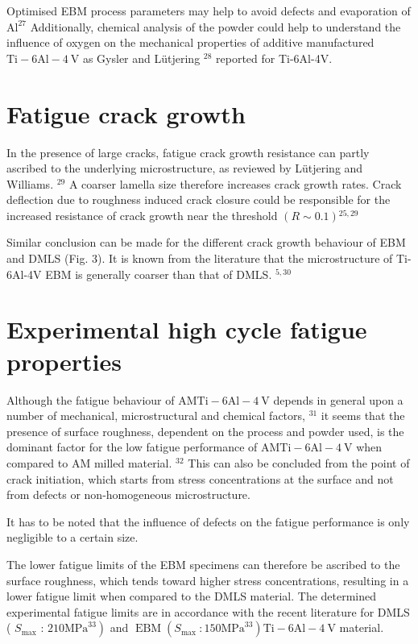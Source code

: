 \documentclass[10pt]{article}
\begin{document}
Optimised EBM process parameters may help to avoid defects and evaporation of $\mathrm{Al}^{27}$ Additionally, chemical analysis of the powder could help to understand the influence of oxygen on the mechanical properties of additive manufactured $\mathrm{Ti}-6 \mathrm{Al}-4 \mathrm{~V}$ as Gysler and Lütjering ${ }^{28}$ reported for Ti-6Al-4V.

\section*{Fatigue crack growth}
In the presence of large cracks, fatigue crack growth resistance can partly ascribed to the underlying microstructure, as reviewed by Lütjering and Williams. ${ }^{29}$ A coarser lamella size therefore increases crack growth rates. Crack deflection due to roughness induced crack closure could be responsible for the increased resistance of crack growth near the threshold $(R \sim 0.1){ }^{25,29}$

Similar conclusion can be made for the different crack growth behaviour of EBM and DMLS (Fig. 3). It is known from the literature that the microstructure of Ti-6Al-4V EBM is generally coarser than that of DMLS. ${ }^{5,30}$

\section*{Experimental high cycle fatigue properties}
Although the fatigue behaviour of $\mathrm{AM} \mathrm{Ti}-6 \mathrm{Al}-4 \mathrm{~V}$ depends in general upon a number of mechanical, microstructural and chemical factors, ${ }^{31}$ it seems that the presence of surface roughness, dependent on the process and powder used, is the dominant factor for the low fatigue performance of $\mathrm{AM} \mathrm{Ti}-6 \mathrm{Al}-4 \mathrm{~V}$ when compared to AM milled material. ${ }^{32}$ This can also be concluded from the point of crack initiation, which starts from stress concentrations at the surface and not from defects or non-homogeneous microstructure.

It has to be noted that the influence of defects on the fatigue performance is only negligible to a certain size.

The lower fatigue limits of the EBM specimens can therefore be ascribed to the surface roughness, which tends toward higher stress concentrations, resulting in a lower fatigue limit when compared to the DMLS material. The determined experimental fatigue limits are in accordance with the recent literature for DMLS ( $S_{\max }$ : $\left.210 \mathrm{MPa}^{33}\right)$ and $\operatorname{EBM}\left(S_{\text {max }}: 150 \mathrm{MPa}^{33}\right) \mathrm{Ti}-6 \mathrm{Al}-4 \mathrm{~V}$ material.
\end{document}
